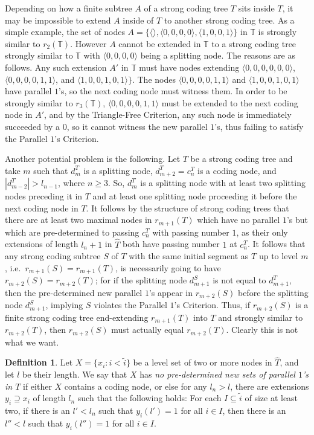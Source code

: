 \documentclass{amsart}
\theoremstyle{remark}
\theoremstyle{definition}
\newtheorem{defn}[thm]{Definition}
\theoremstyle{remark}
\newcommand{\sse}{\subseteq}
\newcommand{\contains}{\supseteq}
\newcommand{\bT}{\mathbb{T}}
\newcommand{\lgl}{\langle}
\newcommand{\rgl}{\rangle}
\newcommand{\POC}{Parallel $1$'s Criterion}
\begin{document}
Depending on how a finite subtree $A$
of  a strong coding tree $T$
sits inside $T$, it may be impossible to extend $A$ inside of $T$ to another strong coding tree.
As a simple example, the set of nodes $A=\{\lgl \rgl,
\lgl 0,0,0,0\rgl,
\lgl 1,0,0,1\rgl\}$ in $\bT$
is strongly similar to  $r_2(\bT)$.
However
  $A$  cannot be  extended in $\bT$ to a strong coding tree strongly similar to $\bT$ with  $\lgl 0,0,0,0\rgl$ being a splitting node.
The reasons are as follows.
  Any  such  extension  $A'$
  in $\bT$ must  have nodes extending $\lgl 0,0,0,0,0,0\rgl$,
 $\lgl 0,0,0,0,1,1\rgl$, and $\lgl 1,0,0,1,0,1\rgl\}$.
The nodes
 $\lgl 0,0,0,0,1,1\rgl$ and $\lgl 1,0,0,1,0,1\rgl$ have  parallel $1$'s,
so the next coding node must witness them.
In order to be strongly similar to $r_3(\bT)$,
$\lgl 0,0,0,0,1,1\rgl$ must be extended to the next coding node in $A'$,
and by the Triangle-Free Criterion, any such node is immediately succeeded by a $0$, so it cannot witness the new parallel $1$'s, thus failing to satisfy the \POC.


Another potential problem is the following.
Let $T$ be a strong coding tree and take $m$ such that $d^T_m$ is a splitting node,
$d^T_{m+2}=c^T_n$ is a coding node,
and $|d^T_{m-2}|>l_{n-1}$,
 where $n\ge 3$.
So, $d^T_m$ is a splitting node with at least two splitting nodes  preceding it in $T$ and at least one splitting node proceeding it before the next coding node in $T$.
It follows by the structure of strong coding trees that
there are at least two maximal nodes in $r_{m+1}(T)$
which have no parallel $1$'s but
 which are pre-determined  to passing $c^T_n$ with passing number $1$,
as their only extensions of length $l_n+1$ in $\widehat{T}$ both have passing number $1$ at $c_n^T$.
It follows  that any  strong coding subtree
 $S$ of $T$
with the same initial segment as $T$ up to
level $m$,  i.e.\
 $r_{m+1}(S)=r_{m+1}(T)$,
 is  necessarily  going to
have $r_{m+2}(S)=r_{m+2}(T)$;
for if
the  splitting node $d^S_{m+1}$ is not equal to $d^T_{m+1}$, then
 the pre-determined new parallel $1$'s appear
 in  $r_{m+2}(S)$ before the splitting node $d^S_{m+1}$,  implying $S$ violates the \POC.
Thus,
if $r_{m+2}(S)$ is a finite strong coding tree end-extending $r_{m+1}(T)$ into $T$ and strongly similar to $r_{m+2}(T)$,
then $r_{m+2}(S)$ must actually equal $r_{m+2}(T)$.
Clearly this is not what we want.



\begin{defn}\label{defn.nopredetll1}
Let $X=\{x_i:i<\tilde{i}\}$ be a level set   of two or more nodes in $\widehat{T}$, and let $l$ be their length.
We say that $X$ has {\em no pre-determined new sets of  parallel $1$'s in $T$}
if  either $X$ contains a coding node, or else
for any $l_n>l$,
there are extensions $y_i\contains x_i$ of length   $l_n$
such that the following holds:
For each $I\sse \tilde{i}$ of size at least two,
if
 there is an $l'< l_n$ such that $y_i(l')=1$ for all $i\in I$,
then there is an $l''< l$ such that $y_i(l'')=1$ for all $i\in I$.
\end{defn}
\end{document}
